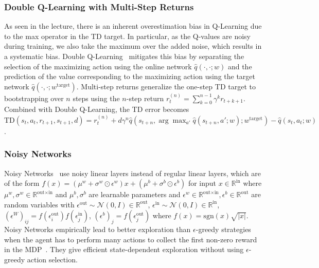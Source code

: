 \subsubsection{Double Q-Learning with Multi-Step Returns}\label{subsubsec:double}

As seen in the lecture, there is an inherent overestimation bias in Q-Learning due to the max operator in the TD target. In particular, as the Q-values are noisy during training, we also take the maximum over the added noise, which results in a systematic bias. Double Q-Learning~\cite{vanhasselt2015deep} mitigates this bias by separating the selection of the maximizing action using the online network $\hat{q}(\cdot, \cdot; w)$ and the prediction of the value corresponding to the maximizing action using the target network $\hat{q}(\cdot, \cdot; w^\text{target})$. %
Multi-step returns generalize the one-step TD target to bootstrapping over $n$ steps using the $n$-step return $r_t^{(n)} = \sum_{k=0}^{n-1} \gamma^kr_{t+k+1}$. Combined with Double Q-Learning, the TD error becomes $\text{TD}(s_t, a_t, r_{t+1}, s_{t+1}, d) = r_t^{(n)} + d\gamma^n\hat{q}\left(s_{t+n}, \arg\max_{a'}\hat{q}(s_{t+n}, a'; w); w^\text{target}\right) - \hat{q}(s_t, a_t; w)$.

\subsubsection{Noisy Networks}\label{subsubsec:noisy}

Noisy Networks~\cite{fortunato2019noisy} use noisy linear layers instead of regular linear layers, which are of the form $f(x) = (\mu^w + \sigma^w \odot \epsilon^w)x + (\mu^b + \sigma^b \odot \epsilon^b)$ for input $x \in \mathbb{R}^{\text{in}}$ where $\mu^w, \sigma^w \in \mathbb{R}^{\text{out} \times \text{in}}$ and $\mu^b, \sigma^b$ are learnable parameters and $\epsilon^w \in \mathbb{R}^{\text{out} \times \text{in}}, \epsilon^b \in \mathbb{R}^{\text{out}}$ are random variables with $\epsilon^\text{out} \sim \mathcal{N}(0, I) \in \mathbb{R}^{\text{out}}$, $\epsilon^\text{in} \sim \mathcal{N}(0, I) \in \mathbb{R}^{\text{in}}$, $(\epsilon^W)_{ij} = f(\epsilon^\text{out}_i)f(\epsilon^\text{in}_j)$, $(\epsilon^b)_j = f(\epsilon^\text{out}_j)$ where $f(x) = \text{sgn}(x)\sqrt{|x|}$.
Noisy Networks empirically lead to better exploration than $\epsilon$-greedy strategies when the agent has to perform many actions to collect the first non-zero reward in the MDP~\cite{Hessel2018:Rainbow}. They give efficient state-dependent exploration without using $\epsilon$-greedy action selection.

